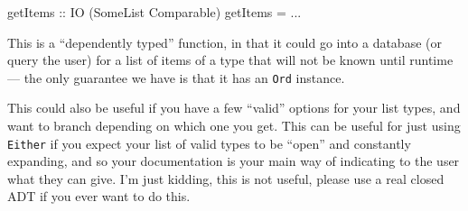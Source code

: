 \documentclass[]{article}
\newenvironment{Shaded}{}{}
\newcommand{\DataTypeTok}[1]{\textcolor[rgb]{0.56,0.13,0.00}{#1}}
\newcommand{\FunctionTok}[1]{\textcolor[rgb]{0.02,0.16,0.49}{#1}}
\newcommand{\KeywordTok}[1]{\textcolor[rgb]{0.00,0.44,0.13}{\textbf{#1}}}
\newcommand{\NormalTok}[1]{#1}
\newcommand{\OperatorTok}[1]{\textcolor[rgb]{0.40,0.40,0.40}{#1}}
\newcommand{\OtherTok}[1]{\textcolor[rgb]{0.00,0.44,0.13}{#1}}
\newcommand{\StringTok}[1]{\textcolor[rgb]{0.25,0.44,0.63}{#1}}
\begin{document}
\begin{Shaded}
\begin{Highlighting}[]
\OtherTok{getItems ::} \DataTypeTok{IO}\NormalTok{ (}\DataTypeTok{SomeList} \DataTypeTok{Comparable}\NormalTok{)}
\NormalTok{getItems }\OtherTok{=} \OperatorTok{...}
\end{Highlighting}
\end{Shaded}

This is a ``dependently typed'' function, in that it could go into a database
(or query the user) for a list of items of a type that will not be known until
runtime --- the only guarantee we have is that it has an \texttt{Ord} instance.

\begin{Shaded}
\end{Shaded}

This could also be useful if you have a few ``valid'' options for your list
types, and want to branch depending on which one you get. This can be useful for
just using \texttt{Either} if you expect your list of valid types to be ``open''
and constantly expanding, and so your documentation is your main way of
indicating to the user what they can give. I'm just kidding, this is not useful,
please use a real closed ADT if you ever want to do this.
\end{document}
